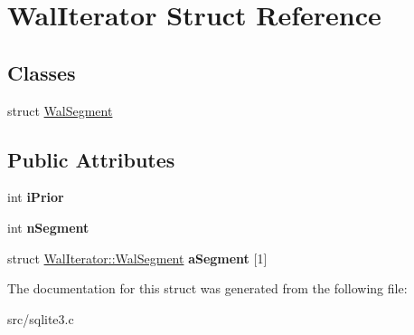\hypertarget{struct_wal_iterator}{\section{Wal\-Iterator Struct Reference}
\label{struct_wal_iterator}
}
\subsection*{Classes}
\begin{DoxyCompactItemize}
\item 
struct \hyperlink{struct_wal_iterator_1_1_wal_segment}{Wal\-Segment}
\end{DoxyCompactItemize}
\subsection*{Public Attributes}
\begin{DoxyCompactItemize}
\item 
\hypertarget{struct_wal_iterator_a2f906125490dd3e967fc53768b03abbb}{int {\bfseries i\-Prior}}\label{struct_wal_iterator_a2f906125490dd3e967fc53768b03abbb}

\item 
\hypertarget{struct_wal_iterator_ad81bc9447d6043212289d127dc9fdafa}{int {\bfseries n\-Segment}}\label{struct_wal_iterator_ad81bc9447d6043212289d127dc9fdafa}

\item 
\hypertarget{struct_wal_iterator_a6d3fcaaeeca5a0eee46f9fa7c3cb669b}{struct \hyperlink{struct_wal_iterator_1_1_wal_segment}{Wal\-Iterator\-::\-Wal\-Segment} {\bfseries a\-Segment} \mbox{[}1\mbox{]}}\label{struct_wal_iterator_a6d3fcaaeeca5a0eee46f9fa7c3cb669b}

\end{DoxyCompactItemize}


The documentation for this struct was generated from the following file\-:\begin{DoxyCompactItemize}
\item 
src/sqlite3.\-c\end{DoxyCompactItemize}
